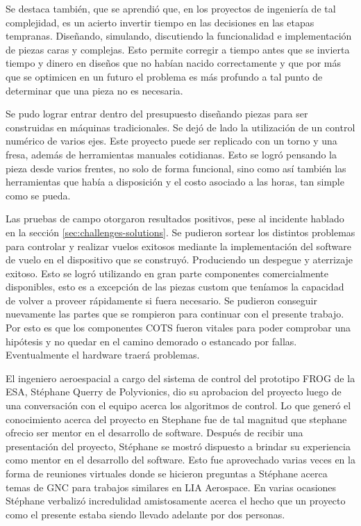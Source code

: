 \medskip

Se destaca también, que se aprendió que, en los proyectos de ingeniería de tal complejidad, es un acierto invertir tiempo en las decisiones en las etapas tempranas. Diseñando, simulando, discutiendo la funcionalidad e implementación de piezas caras y complejas. Esto permite corregir a tiempo antes que se invierta tiempo y dinero en diseños que no habían nacido correctamente y que por más que se optimicen en un futuro el problema es más profundo a tal punto de determinar que una pieza no es necesaria.

Se pudo lograr entrar dentro del presupuesto diseñando piezas para ser construidas en máquinas tradicionales. Se dejó de lado la utilización de un control numérico de varios ejes. Este proyecto puede ser replicado con un torno y una fresa, además de herramientas manuales cotidianas. Esto se logró pensando la pieza desde varios frentes, no solo de forma funcional, sino como así también las herramientas que había a disposición y el costo asociado a las horas, tan simple como se pueda.

Las pruebas de campo otorgaron resultados positivos, pese al incidente hablado en la sección \ref{sec:challenges-solutions}. Se pudieron sortear los distintos problemas para controlar y realizar vuelos exitosos mediante la implementación del software de vuelo en el dispositivo que se construyó. Produciendo un despegue y aterrizaje exitoso. Esto se logró utilizando en gran parte componentes comercialmente disponibles, esto es a excepción de las piezas custom que teníamos la capacidad de volver a proveer rápidamente si fuera necesario. Se pudieron conseguir nuevamente las partes
que se rompieron para continuar con el presente trabajo. Por esto es que los componentes COTS fueron vitales para poder comprobar una hipótesis y no quedar en el camino demorado o estancado por fallas. Eventualmente el hardware traerá problemas.

El ingeniero aeroespacial a cargo del sistema de control del prototipo FROG de la ESA, Stéphane Querry de Polyvionics, dio su aprobacion del proyecto luego de una conversación con el equipo acerca los algoritmos de control.
Lo que generó el conocimiento acerca del proyecto en Stephane fue de tal magnitud que stephane ofrecio ser mentor en el desarrollo de software. Después de recibir una presentación del proyecto, Stéphane se mostró dispuesto a brindar su experiencia como mentor en el desarrollo del software. Esto fue aprovechado varias veces en la forma de reuniones virtuales donde se hicieron preguntas a Stéphane acerca temas de GNC para trabajos similares en LIA Aerospace. En varias ocasiones Stéphane verbalizó incredulidad amistosamente acerca el hecho que un proyecto como el presente estaba siendo llevado adelante por dos personas.

